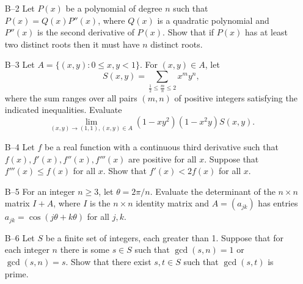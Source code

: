 \documentclass[amssymb,twocolumn,pra,10pt,aps]{revtex4-1}
\begin{document}
\begin{itemize}
\item[B--2]
Let $P(x)$ be a polynomial of degree $n$ such that $P(x)=Q(x)P''(x)$,
where $Q(x)$ is a quadratic polynomial and $P''(x)$ is the second
derivative of $P(x)$.  Show that if $P(x)$ has at least two distinct
roots then it must have $n$ distinct roots.

\item[B--3]
Let $A=\{(x,y):0\leq x,y<1\}$.  For $(x,y)\in A$, let
\[S(x,y) = \sum_{\frac{1}{2}\leq \frac{m}{n}\leq 2} x^m y^n,\]
where the sum ranges over all pairs $(m,n)$ of positive integers
satisfying the indicated inequalities.  Evaluate
\[\lim_{(x,y)\rightarrow (1,1), (x,y)\in A} (1-xy^2)(1-x^2y)S(x,y).\]

\item[B--4]
Let $f$ be a real function with a continuous third derivative such that $f(x),
f'(x), f''(x), f'''(x)$ are positive for all $x$.  Suppose that
$f'''(x)\leq f(x)$ for all $x$.  Show that $f'(x)<2f(x)$ for all $x$.

\item[B--5]
For an integer $n\geq 3$, let $\theta=2\pi/n$.  Evaluate the determinant of the
$n\times n$ matrix $I+A$, where $I$ is the $n\times n$ identity matrix and
$A=(a_{jk})$ has entries $a_{jk}=\cos(j\theta+k\theta)$ for all $j,k$.

\item[B--6]
Let $S$ be a finite set of integers, each greater than 1.  Suppose that
for each integer $n$ there is some $s\in S$ such that $\gcd(s,n)=1$ or
$\gcd(s,n)=s$.  Show that there exist $s,t\in S$ such that $\gcd(s,t)$
is prime.

\end{itemize}
\end{document}

